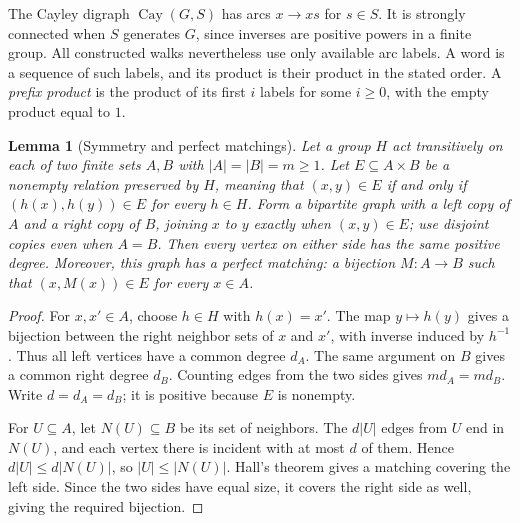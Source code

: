 \documentclass[11pt,a4paper,reqno]{amsart}
\newtheorem{lemma}[theorem]{Lemma}
\theoremstyle{definition}
\theoremstyle{remark}
\numberwithin{equation}{section}
\DeclareMathOperator{\Cay}{Cay}
\begin{document}
The Cayley digraph $\Cay(G,S)$ has arcs $x\to xs$ for $s\in S$. It is strongly connected when $S$ generates $G$, since inverses are positive powers in a finite group. All constructed walks nevertheless use only available arc labels. A word is a sequence of such labels, and its product is their product in the stated order. A \emph{prefix product} is the product of its first $i$ labels for some $i\ge0$, with the empty product equal to $1$.

\begin{lemma}[Symmetry and perfect matchings]\label{lem:symmetry-matching}
Let a group $H$ act transitively on each of two finite sets $A,B$ with $|A|=|B|=m\ge1$. Let $E\subseteq A\times B$ be a nonempty relation preserved by $H$, meaning that $(x,y)\in E$ if and only if $(h(x),h(y))\in E$ for every $h\in H$. Form a bipartite graph with a left copy of $A$ and a right copy of $B$, joining $x$ to $y$ exactly when $(x,y)\in E$; use disjoint copies even when $A=B$. Then every vertex on either side has the same positive degree. Moreover, this graph has a perfect matching: a bijection $M:A\to B$ such that $(x,M(x))\in E$ for every $x\in A$.
\end{lemma}
\begin{proof}
For $x,x'\in A$, choose $h\in H$ with $h(x)=x'$. The map $y\mapsto h(y)$ gives a bijection between the right neighbor sets of $x$ and $x'$, with inverse induced by $h^{-1}$. Thus all left vertices have a common degree $d_A$. The same argument on $B$ gives a common right degree $d_B$. Counting edges from the two sides gives $md_A=md_B$. Write $d=d_A=d_B$; it is positive because $E$ is nonempty.

For $U\subseteq A$, let $N(U)\subseteq B$ be its set of neighbors. The $d|U|$ edges from $U$ end in $N(U)$, and each vertex there is incident with at most $d$ of them. Hence $d|U|\le d|N(U)|$, so $|U|\le|N(U)|$. Hall's theorem gives a matching covering the left side. Since the two sides have equal size, it covers the right side as well, giving the required bijection.
\end{proof}
\end{document}
